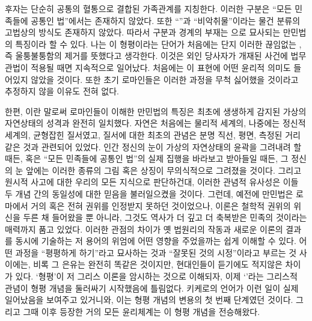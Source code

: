 후자는  단순히 공통의 혈통으로
결합된 가족관계를 지칭한다.
이러한 구분은 ``모든 민족들에 공통인 법''에서는 존재하지 않았다.
또한 ``''과
``비악취물''이라는
물건 분류의 고법상의 방식도 존재하지 않았다.
따라서 구분과 경계의 부재는 으로 묘사되는 만민법의
특징이라 할 수 있다.
나는 이 형평이라는 단어가 처음에는 단지
이러한 끊임없는 , 즉
울퉁불퉁함의 제거를 뜻했다고 생각한다.
이것은 외인 당사자가 개재된 사건에 법무관법이 적용될 때면 지속적으로 일어났다.
처음에는 이 표현에 어떤 윤리적 의미도 들어있지 않았을 것이다.
또한 초기 로마인들은 이러한 과정을 무척 싫어했을 것이라고
추정하지 않을 이유도 전혀 없다.

한편, 이란 말로써 로마인들이 이해한 만민법의 특징은
최초에 생생하게 감지된 가상의 자연상태의 성격과 완전히 일치했다.
자연은 처음에는 물리적 세계의, 나중에는 정신적 세계의, 균형잡힌 질서였고,
질서에 대한 최초의 관념은 분명 직선, 평면, 측정된 거리 같은 것과
관련되어 있었다.
인간 정신의 눈이 가상의 자연상태의 윤곽을 그려내려 할 때든,
혹은 ``모든 민족들에 공통인 법''의 실제 집행을 바라보고 받아들일 때든,
그 정신의 눈 앞에는 이러한 종류의 그림 혹은 상징이 무의식적으로 그려졌을 것이다.
그리고 원시적 사고에 대한 우리의 모든 지식으로 판단하건대,
이러한 관념적 유사성은 이들 두 개념 간의 동일성에 대한 믿음을
불러일으켰을 것이다.
그런데,
예전에 만민법은 로마에서 거의 혹은 전혀 권위를 인정받지 못하던 것이었으나,
 이론은 철학적 권위의 위신을 두른 채 들어왔을 뿐 아니라,
그것도 역사가 더 깊고 더 축복받은 민족의 것이라는 매력까지 품고 있었다.
이러한 관점의 차이가
옛 법원리의 작동과 새로운 이론의 결과를 동시에 기술하는 저 용어의 위엄에
어떤 영향을 주었을까는 쉽게 이해할 수 있다.
어떤 과정을 ``평평하게 하기''라고 묘사하는 것과
``잘못된 것의 시정''이라고 부르는 것 사이에는,
비록 그 은유는 완전히 똑같은 것이지만,
현대인들이 듣기에도 적지않은 차이가 있다.
`형평'이 저 그리스 이론을 암시하는 것으로 이해되자,
이제 `'라는 그리스적 관념이 형평 개념을 둘러싸기 시작했음에 틀림없다.
키케로의 언어가 이런 일이 실제 일어났음을 보여주고 있거니와,
이는 형평 개념의 변용의 첫 번째 단계였던 것이다.
그리고 그때 이후 등장한 거의 모든 윤리체계는 이 형평 개념을 전승해왔다.

